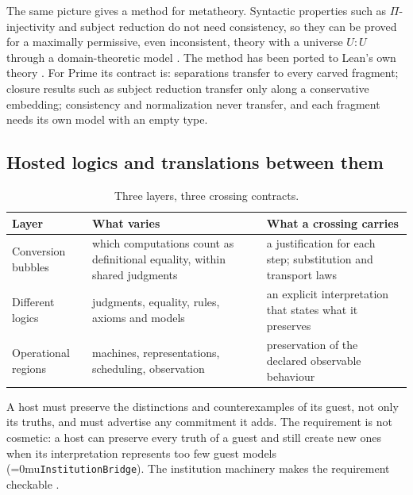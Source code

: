 \documentclass[11pt]{article}
\newcommand{\leanname}[1]{\textup{\Urlmuskip=0mu\relax\nolinkurl{#1}}}
\theoremstyle{definition}
\theoremstyle{remark}
\begin{document}
The same picture gives a method for metatheory. Syntactic properties such as
$\Pi$-injectivity and subject reduction do not need consistency, so they can be
proved for a maximally permissive, even inconsistent, theory with a universe
$U : U$ through a domain-theoretic model \cite{CoquandDomainSemantics}. The
method has been ported to Lean's own theory \cite{CarneiroLean4Lean}. For Prime
its contract is: separations transfer to every carved fragment; closure results
such as subject reduction transfer only along a conservative embedding;
consistency and normalization never transfer, and each fragment needs its own
model with an empty type.

\subsection{Hosted logics and translations between them}

\begin{table}[ht]
\centering\small
\begin{tabular}{>{\raggedright\arraybackslash}p{2.6cm}
  >{\raggedright\arraybackslash}p{5.2cm}
  >{\raggedright\arraybackslash}p{5.2cm}}
\toprule
Layer & What varies & What a crossing carries\\
\midrule
Conversion bubbles & which computations count as definitional equality,
  within shared judgments & a justification for each step; substitution and
  transport laws\\
Different logics & judgments, equality, rules, axioms and models & an explicit
  interpretation that states what it preserves\\
Operational regions & machines, representations, scheduling, observation &
  preservation of the declared observable behaviour\\
\bottomrule
\end{tabular}
\caption{Three layers, three crossing contracts.}
\label{tab:three-layers}
\end{table}

A host must preserve the distinctions and counterexamples of its guest, not
only its truths, and must advertise any commitment it adds. The requirement is
not cosmetic: a host can preserve every truth of a guest and still create new
ones when its interpretation represents too few guest models
(\leanname{InstitutionBridge}). The institution machinery makes the
requirement checkable \cite{GoguenBurstallInstitutions}.
\end{document}
